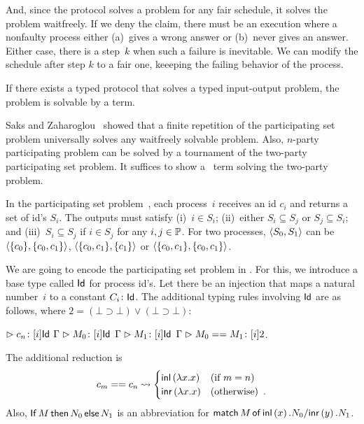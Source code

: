 {And, since the protocol solves a problem for any fair schedule, it
solves the problem waitfreely.
If we deny the claim, there must be an execution where a nonfaulty
process
either (a)~gives a
wrong answer or
 (b)~never gives an answer.
 Either case, there is a step~$k$ when
 such a failure is inevitable.
We can modify the schedule after step $k$ to a fair one,
keeeping the failing behavior of
the process.

\begin{theorem}[Completeness]
If there exists a typed protocol that solves a typed input-output
 problem,
the problem is solvable by a term.
\end{theorem}

Saks and Zaharoglou~\cite{Saks:1993vq} showed that a finite repetition of the participating set
problem universally solves any waitfreely solvable problem.
Also, $n$-party participating problem can be solved by a tournament of
the two-party participating set problem.
It suffices to show a \lgd\, term solving the two-party problem.


In the participating set problem~\cite{borowsky},
each process~$i$ receives an id $c_i$ and
returns a set of id's $S_i$.
The outputs must satisfy (i)~$i\in S_i$; (ii)~either $S_i\subseteq S_j$
or $S_j\subseteq S_i$; and (iii)~$S_i\subseteq S_j$  if $i\in S_j$ for any
$i,j\in\mathbb{P}$.
For two processes,
$\langle{S_0, S_1}\rangle$ can be $\langle{\{c_0\}, \{c_0, c_1\}}\rangle$, $\langle{\{c_0, c_1\}, \{c_1\}}\rangle$
or
$\langle{\{c_0, c_1\}, \{c_0, c_1\}}\rangle$.

We are going to encode the participating set problem in \lgd.
For this, we introduce a base type called $\mathsf{Id}$ for process id's.
Let there be an injection that maps a natural number~$i$ to a constant
$C_i\colon\mathsf{Id}$.
The additional typing rules involving $\mathsf{Id}$ are as follows, where $2 = (\bot\supset\bot)\vee(\bot\supset\bot)$:
\begin{center}
 \UnaryRule{}{}
 {$\vartriangleright {c_n} \colon{[i]\mathsf{Id}}$}
 \hfill
 \BinaryRule
 {$\Gamma\vartriangleright {M_0} \colon{[}i]\mathsf{Id}$}
 {$\Gamma\vartriangleright {M_1} \colon{[}i]\mathsf{Id}$}
 {}
 {$\Gamma \vartriangleright {{M_0} == {M_1}} \colon{[i]2}$}\enspace.
\end{center}
The additional reduction is
\[
 c_m == c_n \rightsquigarrow
\begin{cases}
 \mathsf{inl}\left({\lambda x.x}\right)& (\text{if } m = n)\\
 \mathsf{inr}\left({\lambda x.x}\right)& (\text{otherwise})\enspace.
\end{cases}
\]
Also,
${\mathsf{If}\, {M}\, \mathsf{then}\, {N_0}\, \mathsf{else}\, {N_1}}$
is an abbreviation for
${\mathsf{match}\,{M}\,\mathsf{of}\, \mathsf{inl}\left({x}\right). {N_0}/ \mathsf{inr}\left({y}\right). {N_1}}$.

}
